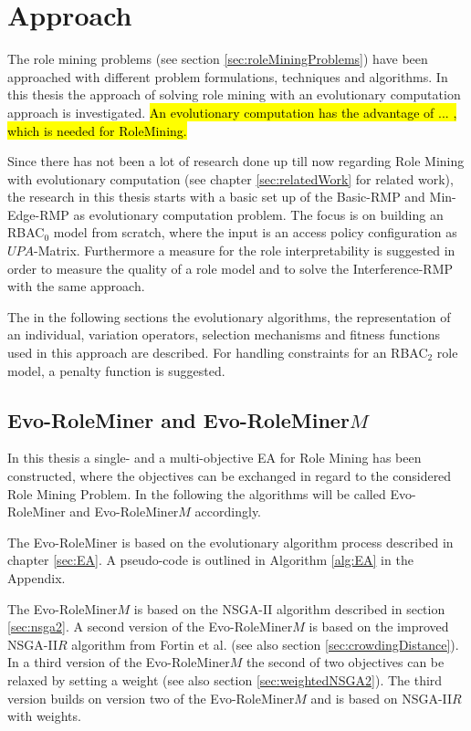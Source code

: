 \newpage
\chapter{Approach}
\label{sec:approach}
The role mining problems (see section \ref{sec:roleMiningProblems}) have been approached with different problem formulations, techniques and algorithms. In this thesis the approach of solving role mining with an evolutionary computation approach is investigated. \hl{An evolutionary computation has the advantage of ... , which is needed for RoleMining.}

Since there has not been a lot of research done up till now regarding Role Mining with evolutionary computation (see chapter \ref{sec:relatedWork} for related work), the research in this thesis starts with a basic set up of the Basic-RMP and Min-Edge-RMP as evolutionary computation problem. The focus is on building an RBAC$_0$ model from scratch, where the input is an access policy configuration as $UPA$-Matrix. Furthermore a measure for the role interpretability is suggested in order to measure the quality of a role model and to solve the Interference-RMP with the same approach.  

The in the following sections the evolutionary algorithms, the representation of an individual, variation operators, selection mechanisms and fitness functions used in this approach are described. For handling constraints for an RBAC$_2$ role model, a penalty function is suggested.

	\section{Evo-RoleMiner and Evo-RoleMiner$M$}
	\label{sec:EvoRoleMiner}
	In this thesis a single- and a multi-objective EA for Role Mining has been constructed, where the objectives can be exchanged in regard to the considered Role Mining Problem. In the following the algorithms will be called Evo-RoleMiner and Evo-RoleMiner$M$ accordingly.
	
	The Evo-RoleMiner is based on the evolutionary algorithm process described in chapter \ref{sec:EA}. A pseudo-code is outlined in Algorithm \ref{alg:EA} in the Appendix.
	
	The Evo-RoleMiner$M$ is based on the NSGA-II algorithm described in section \ref{sec:nsga2}. A second version of the Evo-RoleMiner$M$ is based on the improved NSGA-II$R$ algorithm from Fortin et al.\cite{Fortin:2013} (see also section \ref{sec:crowdingDistance}). In a third version of the Evo-RoleMiner$M$ the second of two objectives can be relaxed by setting a weight (see also section \ref{sec:weightedNSGA2}). The third version builds on version two of the Evo-RoleMiner$M$ and is based on NSGA-II$R$ with weights.
    
